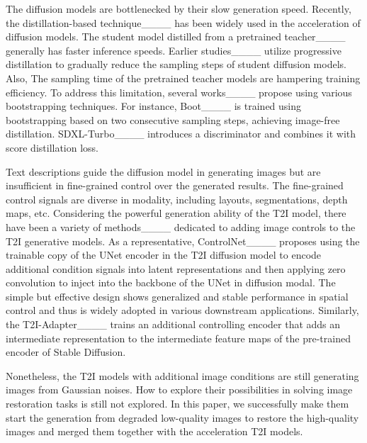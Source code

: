 \vspace{-1mm}
The diffusion models are bottlenecked by their slow generation speed.
Recently, the distillation-based technique____ has been widely used in the acceleration of diffusion models.
The student model distilled from a pretrained teacher____ generally has faster inference speeds. 
Earlier studies____ utilize progressive distillation to gradually reduce the sampling steps of student diffusion models.
Also, The sampling time of the pretrained teacher models are hampering training efficiency.
To address this limitation, several works____ 
propose using various bootstrapping techniques.
For instance, Boot____ is trained using bootstrapping based on two consecutive sampling steps, achieving image-free distillation. SDXL-Turbo____ introduces a discriminator and combines it with score distillation loss. 

\vspace{-1mm}
Text descriptions guide the diffusion model in generating images but are insufficient in fine-grained control over the generated results. The fine-grained control signals are diverse in modality, including layouts, segmentations, depth maps, etc.
Considering the powerful generation ability of the T2I model, there have been a variety of methods____ dedicated to adding image controls to the T2I generative models.
As a representative, ControlNet____ proposes using the trainable copy of the UNet encoder in the T2I diffusion model to encode additional condition signals into latent representations and then applying zero convolution to inject into the backbone of the UNet in diffusion modal. The simple but effective design shows generalized and stable performance in spatial control and thus is widely adopted in various downstream applications. 
Similarly, the T2I-Adapter____ trains an additional controlling encoder that adds an intermediate representation to the intermediate feature maps of the pre-trained encoder of Stable Diffusion. 

Nonetheless, the T2I models with additional image conditions are still generating images from Gaussian noises. How to explore their possibilities in solving image restoration tasks is still not explored. In this paper, we successfully make them start the generation from degraded low-quality images to restore the high-quality images and merged them together with the acceleration T2I models.